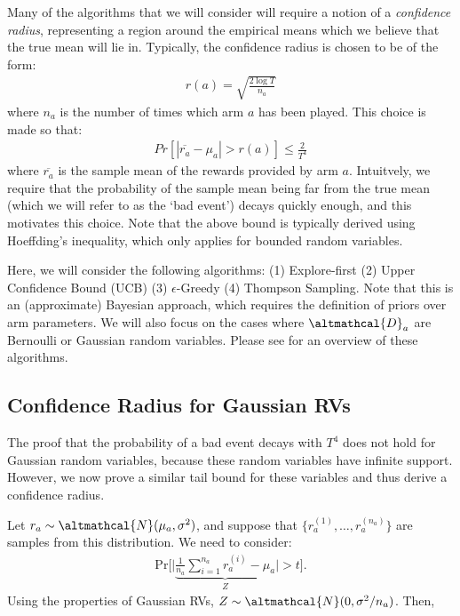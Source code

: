 \documentclass[a4paper]{article}
\begin{document}
	Many of the algorithms that we will consider will require a notion of a \emph{confidence radius}, representing a region around the empirical means which we believe that the true mean will lie in. Typically, the confidence radius is chosen to be of the form:
	\begin{align}
	r(a) = \sqrt{\frac{2 \log T}{n_a}}
	\end{align} 
	where $n_a$ is the number of times which arm $a$ has been played. This choice is made so that:
	\begin{align}
	Pr[|\overline{r_a} - \mu_a| > r(a)] \leq \frac{2}{T^4}
	\end{align}
	where $\overline{r_a}$ is the sample mean of the rewards provided by arm $a$. Intuitvely, we require that the probability of the sample mean being far from the true mean (which we will refer to as the `bad event') decays quickly enough, and this motivates this choice. Note that the above bound is typically derived using Hoeffding's inequality, which only applies for bounded random variables. 
	
	Here, we will consider the following algorithms: (1) Explore-first (2) Upper Confidence Bound (UCB) (3) $\epsilon$-Greedy (4) Thompson Sampling. Note that this is an (approximate) Bayesian approach, which requires the definition of priors over arm parameters. We will also focus on the cases where $\altmathcal{D}_a$ are Bernoulli or Gaussian random variables. Please see \cite{book} for an overview of these algorithms. 
	
	\subsection{Confidence Radius for Gaussian RVs}
	The proof that the probability of a bad event decays with $T^4$ does not hold for Gaussian random variables, because these random variables have infinite support. However, we now prove a similar tail bound for these variables and thus derive a confidence radius. 
	
	Let $r_a \sim \altmathcal{N}(\mu_a, \sigma^2)$, and suppose that $\lbrace r_a^{(1)}, \ldots, r_a^{(n_a)} \rbrace$ are samples from this distribution. We need to consider:
	\begin{align}
	\text{Pr}\Big[ \Big| \underbrace{\frac{1}{n_a} \sum_{i=1}^{n_a} r_a^{(i)} - \mu_a}_{Z} \Big| > t \Big].
	\end{align}
	Using the properties of Gaussian RVs, $Z \sim \altmathcal{N}(0, \sigma^2 / n_a)$. Then, 
	
\end{document}

